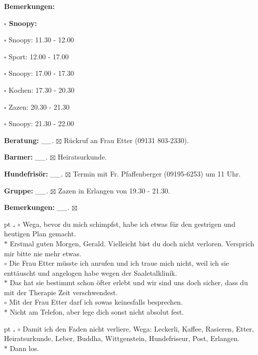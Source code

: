 \documentclass[10pt,a4paper]{article}
\newcounter{notec}
\newcommand\notep[1]{%
  \stepcounter{notec}
  \vskip #1pt
  {\bf\arabic{notec}.}
}
\newcommand\prop[1] {{\color {alizarin} {\bf #1}}}             %
\newcommand\opti[1] {{\color {amethyst} {\bf #1}}}             %
\newcommand\mand[1] {{\color {burntorange} {\bf #1}}}          %
\newcommand\bottomspace{\vskip 4pt}
\newcommand\n[1] { {\sl #1.} \hskip 5pt }
\begin{document}
\begin{mdframed}[style=daystyle]
\begin{labeling}{{\mand {Bemerkungen:}}}
\begin{minipage}{0.75\textwidth}
\begin{labeling}{\prop {$\square$ {Snoopy:}}}
      \item[$\square$ Snoopy:] 11.30 - 12.00
      \item[$\square$ Sport:]  12.00 - 17.00
        
      \item[$\square$ Snoopy:] 17.00 - 17.30
      \item[$\square$ Kochen:] 17.30 - 20.30
        
      \item[$\square$ Zazen:]  20.30 - 21.30
      \item[$\square$ Snoopy:] 21.30 - 22.00
      \end{labeling}
    \end{minipage}
    \bottomspace
  \item[{\opti {Beratung:}}]     \n{\_\_} $\boxtimes$ Rückruf an Frau Etter (09131 803-2330).
  \item[{\opti {Barmer:}}]       \n{\_\_} $\boxtimes$ Heiratsurkunde.
  \item[{\opti {Hundefrisör:}}]  \n{\_\_} $\boxtimes$ Termin mit Fr. Pfaffenberger (09195-6253) um 11 Uhr.
  \item[{\opti {Gruppe:}}]       \n{\_\_} $\boxtimes$ Zazen in Erlangen von 19.30 - 21.30.
  \item[{\mand {Bemerkungen:}}]  \n{\_\_} $\boxtimes$
  \end{labeling}
    
  \setcounter{notec}{0}
  
  \notep 0 $\circ$ Wega, bevor du mich schimpfst, habe ich etwas für den
  gestrigen und heutigen Plan gemacht. \\
  $\ast$ Erstmal guten Morgen, Gerald. Vielleicht bist du doch nicht verloren.
  Versprich mir bitte nie mehr etwas. \\
  $\circ$ Die Frau Etter müsste ich anrufen und ich traue mich nicht, weil ich
  sie enttäuscht und angelogen habe wegen der Saaletalklinik. \\
  $\ast$ Das hat sie bestimmt schon öfter erlebt und wir sind uns doch sicher,
  dass du mit der Therapie Zeit verschwendest. \\
  $\circ$ Mit der Frau Etter darf ich sowas keinesfalls besprechen. \\
  $\ast$ Nicht am Telefon, aber lege dich sonst nicht absolut fest.
  
  \notep 4 $\circ$ Damit ich den Faden nicht verliere, Wega: Leckerli, Kaffee,
  Rasieren, Etter, Heiratsurkunde, Leber, Buddha, Wittgenstein, Hundefriseur,
  Post, Erlangen. \\
  $\ast$ Dann los.
  

\end{mdframed}
\end{document}
